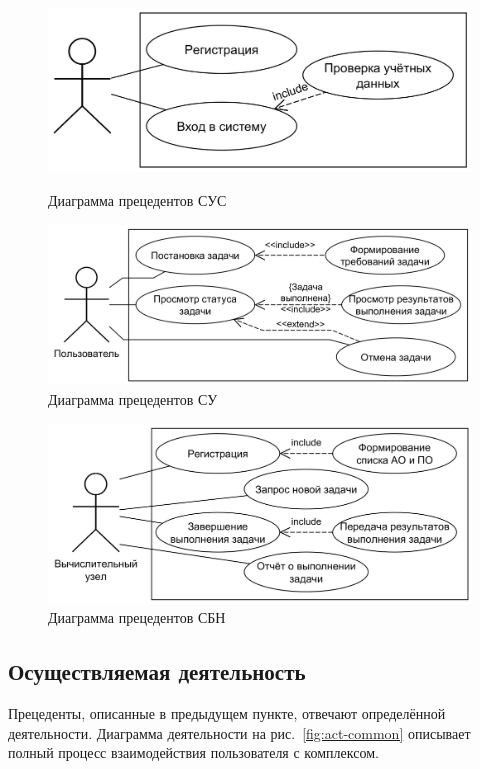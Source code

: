 \documentclass[a4paper,12pt]{report}
\numberwithin{equation}{section}
\begin{document}
  \begin{figure}
    \centering
    \begin{minipage}{.49\linewidth}
      \centering
      \includegraphics[width=\linewidth]{diagrams/session/usecase}
      \caption{Диаграмма прецедентов СУС}
      \label{fig:prec-session}
    \end{minipage}
    \hfill
    \begin{minipage}{.49\linewidth}
      \centering
      \includegraphics[width=\linewidth]{diagrams/logic/usecase}
      \caption{Диаграмма прецедентов СУ}
      \label{fig:prec-logic}
    \end{minipage}  
  \end{figure}
  
  \begin{figure}
    \centering
    \includegraphics[width=.6\linewidth]{diagrams/balancer/usecase}
    \caption{Диаграмма прецедентов СБН}
    \label{fig:prec-balancer}
  \end{figure}
  
  \subsection{Осуществляемая деятельность}
  Прецеденты, описанные в предыдущем пункте, отвечают определённой деятельности.
  Диаграмма деятельности на рис.~\ref{fig:act-common} описывает полный процесс взаимодействия пользователя с комплексом.
  
\end{document}
